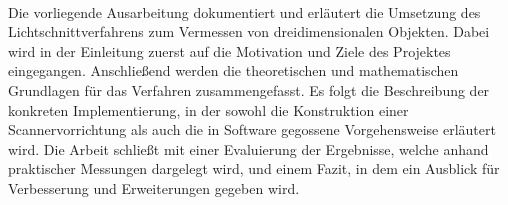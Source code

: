 \kurzfassung

\paragraph*{}
Die vorliegende Ausarbeitung dokumentiert und erläutert die Umsetzung des Lichtschnittverfahrens zum Vermessen von dreidimensionalen Objekten. Dabei wird in der Einleitung zuerst auf die Motivation und Ziele des Projektes eingegangen. Anschließend werden die theoretischen und mathematischen Grundlagen für das Verfahren zusammengefasst. Es folgt die Beschreibung der konkreten Implementierung, in der sowohl die Konstruktion einer Scannervorrichtung als auch die in Software gegossene Vorgehensweise erläutert wird. Die Arbeit schließt mit einer Evaluierung der Ergebnisse, welche anhand praktischer Messungen dargelegt wird, und einem Fazit, in dem ein Ausblick für Verbesserung und Erweiterungen gegeben wird.